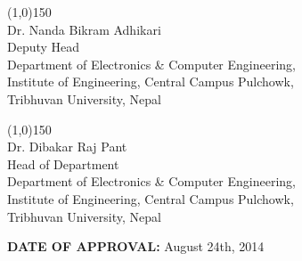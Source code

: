 \vspace{1cm}
\noindent
\begin{minipage}[t]{0.45\textwidth}
\line(1,0){150}\\
Dr. Nanda Bikram Adhikari\\
Deputy Head\\
Department of Electronics \& Computer Engineering,\\
Institute of Engineering, Central Campus Pulchowk,\\
Tribhuvan University, Nepal
\end{minipage}\hfill
\begin{minipage}[t]{0.45\textwidth}
\line(1,0){150}\\
Dr. Dibakar Raj Pant\\
Head of Department\\
Department of Electronics \& Computer Engineering,\\    
Institute of Engineering, Central Campus Pulchowk, \\
Tribhuvan University, Nepal
\end{minipage}
\vspace{1cm}
\begin{flushleft}
\textbf{DATE OF APPROVAL:} August 24th, 2014
\end{flushleft} 

